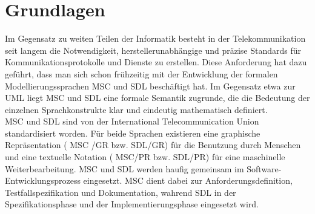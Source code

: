 \chapter{Grundlagen}
\label{ch:Grundlagen}
Im Gegensatz zu weiten Teilen der Informatik besteht in der Telekommunikation seit langem die Notwendigkeit, herstellerunabhängige und präzise Standards für Kommunikationsprotokolle und Dienste zu erstellen. Diese Anforderung hat dazu geführt, dass man sich schon frühzeitig mit der Entwicklung der formalen Modellierungssprachen \acs{MSC} und \acs{SDL} beschäftigt hat. Im Gegensatz etwa zur \acs{UML} liegt \acs{MSC} und \acs{SDL} eine formale Semantik zugrunde, die die Bedeutung der einzelnen Sprachkonstrukte klar und eindeutig mathematisch definiert.\\
 \ac{MSC} und \ac{SDL} sind von der International Telecommunication Union standardisiert worden. Für beide Sprachen existieren eine graphische Repräsentation ( \ac{MSC} /GR bzw.  \ac{SDL}/GR) für die Benutzung durch Menschen und eine textuelle Notation ( \ac{MSC}/PR bzw. \ac{SDL}/PR) für eine maschinelle Weiterbearbeitung. \ac{MSC}  und \ac{SDL}  werden haufig gemeinsam im Software-Entwicklungsprozess eingesetzt. \ac{MSC} dient dabei zur Anforderungsdefinition, Testfallspezifikation und Dokumentation, wahrend  \ac{SDL} in der Spezifikationsphase und der Implementierungsphase eingesetzt wird.




